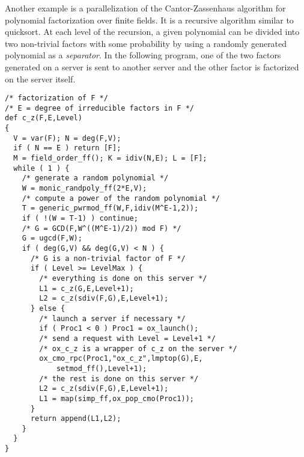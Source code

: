 Another example is a parallelization of the Cantor-Zassenhaus
algorithm for polynomial factorization over finite fields.
It is a recursive algorithm similar to quicksort.
At each level of the recursion, a given polynomial can be
divided into two non-trivial factors with some probability by using 
a randomly generated polynomial as a {\it separator}.
In the following program, one of the two factors generated on a server
is sent to another server and the other factor is factorized on the server
itself. 
\begin{verbatim}
/* factorization of F */
/* E = degree of irreducible factors in F */
def c_z(F,E,Level)
{
  V = var(F); N = deg(F,V);
  if ( N == E ) return [F];
  M = field_order_ff(); K = idiv(N,E); L = [F];
  while ( 1 ) {
    /* generate a random polynomial */
    W = monic_randpoly_ff(2*E,V);
    /* compute a power of the random polynomial */
    T = generic_pwrmod_ff(W,F,idiv(M^E-1,2));
    if ( !(W = T-1) ) continue;
    /* G = GCD(F,W^((M^E-1)/2)) mod F) */
    G = ugcd(F,W);
    if ( deg(G,V) && deg(G,V) < N ) {
      /* G is a non-trivial factor of F */
      if ( Level >= LevelMax ) {
        /* everything is done on this server */
        L1 = c_z(G,E,Level+1);
        L2 = c_z(sdiv(F,G),E,Level+1);
      } else {
        /* launch a server if necessary */
        if ( Proc1 < 0 ) Proc1 = ox_launch();
        /* send a request with Level = Level+1 */
        /* ox_c_z is a wrapper of c_z on the server */
        ox_cmo_rpc(Proc1,"ox_c_z",lmptop(G),E,
            setmod_ff(),Level+1);
        /* the rest is done on this server */
        L2 = c_z(sdiv(F,G),E,Level+1);
        L1 = map(simp_ff,ox_pop_cmo(Proc1));
      }
      return append(L1,L2);
    }
  }
}
\end{verbatim}







